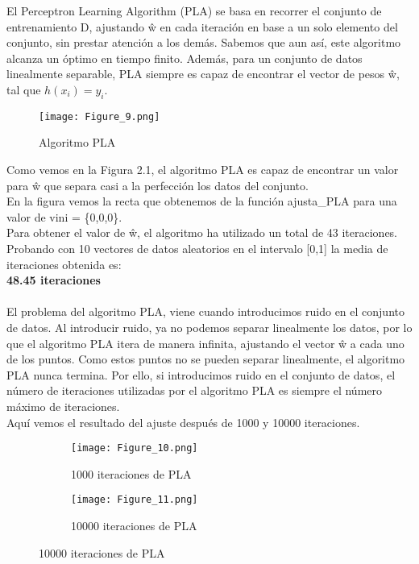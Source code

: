 El Perceptron Learning Algorithm (PLA) se basa en recorrer el conjunto de entrenamiento D, ajustando ŵ en cada iteración en base a un solo elemento del conjunto, sin prestar atención a los demás.
Sabemos que aun así, este algoritmo alcanza un óptimo en tiempo finito.  Además, para un conjunto de datos linealmente separable, PLA siempre es capaz de encontrar el vector de pesos ŵ, tal que $ h(x_{i}) = y_{i} $.

\begin{figure}[h]
   \centering
   \texttt{[image: Figure\_9.png]}
   \caption{Algoritmo PLA}
\end{figure}

Como vemos en la Figura 2.1, el algoritmo PLA es capaz de encontrar un valor para ŵ que separa casi a la perfección los datos del conjunto.\\
En la figura vemos la recta que obtenemos de la función ajusta\_PLA para una valor de vini = \{0,0,0\}.\\
Para obtener el valor de ŵ, el algoritmo ha utilizado un total de 43 iteraciones.\\
Probando con 10 vectores de datos aleatorios en el intervalo [0,1] la media de iteraciones obtenida es:\\ \textbf{48.45 iteraciones}
\\\\
El problema del algoritmo PLA, viene cuando introducimos ruido en el conjunto de datos.
Al introducir ruido, ya no podemos separar linealmente los datos, por lo que el algoritmo PLA itera de manera infinita, ajustando el vector ŵ a cada uno de los puntos.
Como estos puntos no se pueden separar linealmente, el algoritmo PLA nunca termina. Por ello, si introducimos ruido en el conjunto de datos, el número de iteraciones utilizadas por el algoritmo PLA es siempre el número máximo de iteraciones.
\\
Aquí vemos el resultado del ajuste después de 1000 y 10000 iteraciones.

\begin{figure}[h]
   \centering
   \begin{subfigure}[b]{0.45\textwidth}
      \texttt{[image: Figure\_10.png]}
      \caption{1000 iteraciones de PLA}
   \end{subfigure}
   \hfill
   \begin{subfigure}[b]{0.45\textwidth}
      \texttt{[image: Figure\_11.png]}
      \caption{10000 iteraciones de PLA}
   \end{subfigure}
\end{figure}

